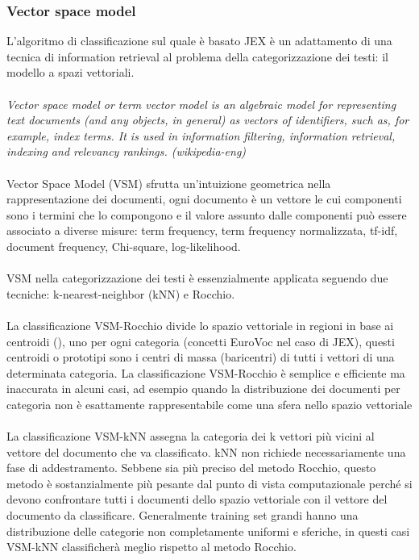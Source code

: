 \documentclass{article}
\theoremstyle{plain}
\theoremstyle{definition}
\begin{document}
\subsubsection{Vector space model}
L'algoritmo di classificazione sul quale è basato JEX è un adattamento di una tecnica di information retrieval al problema della categorizzazione dei testi: il modello a spazi vettoriali. 
\\
\\
\textit{
Vector space model or term vector model is an algebraic model for representing text documents (and any objects, in general) as vectors of identifiers, such as, for example, index terms. It is used in information filtering, information retrieval, indexing and relevancy rankings. (wikipedia-eng)
}
\\
\\
Vector Space Model (VSM) sfrutta un'intuizione geometrica nella rappresentazione dei documenti, ogni documento è un vettore le cui componenti sono i termini che lo compongono e il valore assunto dalle componenti può essere associato a diverse misure: term frequency, term frequency normalizzata, tf-idf, document frequency, Chi-square, log-likelihood.
\\
\\  
VSM nella categorizzazione dei testi è essenzialmente applicata seguendo due tecniche: k-nearest-neighbor (kNN) e Rocchio.\footnotemark
{}
\\
\\
La classificazione VSM-Rocchio divide lo spazio vettoriale in regioni in base ai centroidi (), uno per ogni categoria (concetti EuroVoc nel caso di JEX), questi centroidi o prototipi sono i centri di massa (baricentri) di tutti i vettori di una determinata categoria. La classificazione VSM-Rocchio è semplice e efficiente ma inaccurata in alcuni casi, ad esempio quando la distribuzione dei documenti per categoria non è esattamente rappresentabile come una sfera nello spazio vettoriale
\\
\\
La classificazione VSM-kNN assegna la categoria dei k vettori più vicini al vettore del documento che va classificato. kNN non richiede necessariamente una fase di addestramento. Sebbene sia più preciso del metodo Rocchio, questo metodo è sostanzialmente più pesante dal punto di vista computazionale perché si devono confrontare tutti i documenti dello spazio vettoriale con il vettore del documento da classificare. Generalmente training set grandi hanno una distribuzione delle categorie non completamente uniformi e sferiche, in questi casi VSM-kNN classificherà meglio rispetto al metodo Rocchio.
\end{document}
